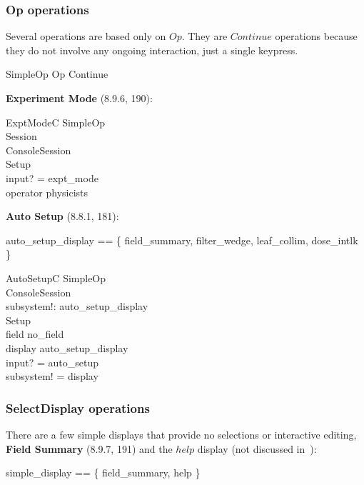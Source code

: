 \subsubsection{Op operations}

Several operations are based only on $Op$.  They are $Continue$
operations because they do not involve any ongoing interaction, just a
single keypress.

\begin{zed} SimpleOp  Op \land Continue \end{zed}

{\bf Experiment Mode} (8.9.6, 190):

\begin{schema}{ExptModeC}
	SimpleOp \\
	\Xi Session \\
	\Delta ConsoleSession \\
\where
	Setup \\
	input? = expt\_mode \\
	operator \in physicists \\
\end{schema}
{\bf Auto Setup} (8.8.1, 181):

\begin{zed}
auto\_setup\_display == \{ field\_summary, filter\_wedge, leaf\_collim, dose\_intlk \}
\end{zed}
\begin{schema}{AutoSetupC}
	SimpleOp \\
	\Xi ConsoleSession \\
	subsystem!: auto\_setup\_display \\
\where
	Setup \\
	field \neq no\_field \\
	display \in auto\_setup\_display \\
	input? = auto\_setup \\
	subsystem! = display \\
\end{schema}

\subsubsection{SelectDisplay operations}

There are a few simple displays that provide no selections or
interactive editing, {\bf Field Summary} (8.9.7, 191) and
the $help$ display (not discussed in~\cite{jacky92}):

\begin{zed} simple\_display == \{  field\_summary, help \} \end{zed}

